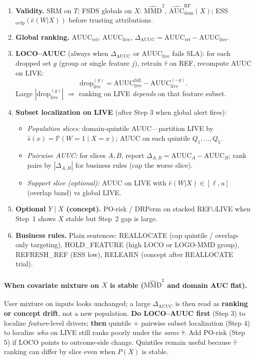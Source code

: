 \begin{enumerate}
  \item \textbf{Validity.} SRM on $T$; FSDS globals on $X$: $\widehat{\mathrm{MMD}}^2$, $\widehat{\mathrm{AUC}}_{\mathrm{dom}}^{\mathrm{RF}}(X)$; ESS$_{\mathrm{ovlp}}(\hat e(W|X))$ before trusting attributions.
  \item \textbf{Global ranking.} $\mathrm{AUUC}_{\mathrm{ref}}$, $\mathrm{AUUC}_{\mathrm{live}}$, $\Delta_{\mathrm{AUUC}}=\mathrm{AUUC}_{\mathrm{ref}}-\mathrm{AUUC}_{\mathrm{live}}$.
  \item \textbf{LOCO--AUUC} (always when $\Delta_{\mathrm{AUUC}}$ or $\mathrm{AUUC}_{\mathrm{live}}$ fails SLA):
  for each dropped set $g$ (group or single feature $j$), retrain $\hat\tau$ on REF, recompute AUUC on LIVE:
  \[
    \mathrm{drop}_{\mathrm{live}}^{(g)} = \mathrm{AUUC}_{\mathrm{live}}^{\mathrm{full}} - \mathrm{AUUC}_{\mathrm{live}}^{(-g)}.
  \]
  Large $|\mathrm{drop}_{\mathrm{live}}^{(g)}|$ $\Rightarrow$ ranking on LIVE \emph{depends} on that feature subset.
  \item \textbf{Subset localization on LIVE} (after Step 3 when global alert fires):
  \begin{itemize}
    \item \emph{Population slices:} domain-quintile AUUC---partition LIVE by $\hat s(x)=\mathbb P(W{=}1\mid X=x)$; AUUC on each quintile $Q_1,\ldots,Q_5$.
    \item \emph{Pairwise AUUC:} for slices $A,B$, report $\Delta_{A,B}=\mathrm{AUUC}_A-\mathrm{AUUC}_B$; rank pairs by $|\Delta_{A,B}|$ for business rules (cap the worse slice).
    \item \emph{Support slice (optional):} AUUC on LIVE with $\hat e(W|X)\in[\ell,u]$ (overlap band) vs global LIVE.
  \end{itemize}
  \item \textbf{Optional $Y\mid X$ (concept).} PO-risk / DRPerm on stacked REF$\cup$LIVE when Step~1 shows $X$ stable but Step~2 gap is large.
  \item \textbf{Business rules.} Plain sentences: REALLOCATE (cap quintile / overlap-only targeting), HOLD\_FEATURE (high LOCO or LOGO-MMD group), REFRESH\_REF (ESS low), RELEARN (concept after REALLOCATE trial).
\end{enumerate}

\paragraph{When covariate mixture on $X$ is stable ($\widehat{\mathrm{MMD}}^2$ and domain AUC flat).}
User mixture on inputs looks unchanged; a large $\Delta_{\mathrm{AUUC}}$ is then read as \textbf{ranking or concept drift}, not a new population.
\textbf{Do LOCO--AUUC first} (Step 3) to localize \emph{feature}-level drivers; \textbf{then} quintile + pairwise subset localization (Step 4) to localize \emph{who} on LIVE still ranks poorly under the \emph{same} $\hat\tau$.
Add PO-risk (Step 5) if LOCO points to outcome-side change.
Quintiles remain useful because $\hat\tau$ ranking can differ by slice even when $P(X)$ is stable.

